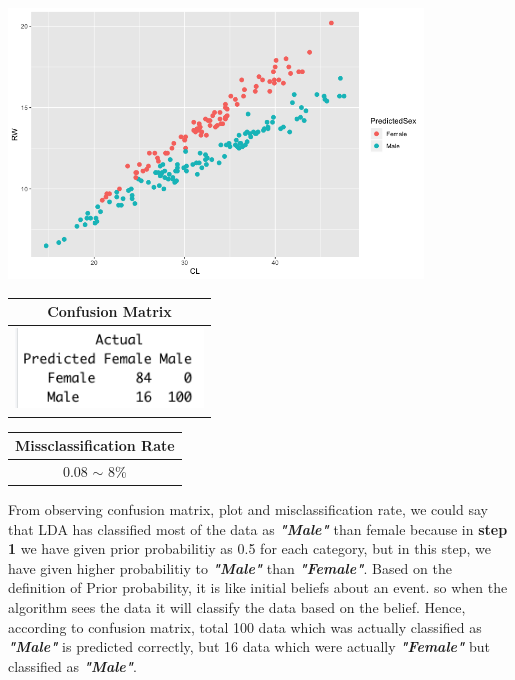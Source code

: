 \documentclass[a4paper,10pt]{article}
\begin{document}
\begin{center}
  \includegraphics[width=110mm,scale=0.10]{CL_RW_Lda_Plot_Priors.png} 
  \begin{tabular}{|c|}
    \hline
    \textbf{Confusion Matrix} \\
    \hline
    \includegraphics[width=50mm,scale=0.10]{CL_RW_LDA_Confusion_Matrix_Prior.png} \\
    \hline
  \end{tabular} \par
  \begin{tabular}{|c|}
    \hline
    \textbf{Missclassification Rate} \\
    \hline
    0.08 $\sim$ 8\% \\
    \hline
  \end{tabular}
\end{center} \par
From observing confusion matrix, plot and misclassification rate, we could say that LDA has classified most of the data as
\textbf{\textit{"Male"}} than female because in \textbf{step 1} we have given prior probabilitiy as 0.5 for each
category, but in this step, we have given higher probabilitiy to \textbf{\textit{"Male"}} than \textbf{\textit{"Female"}}. 
Based on the definition of Prior probability, it is like initial beliefs about an event. 
so when the algorithm sees the data it will classify the data based on the belief. Hence, according to confusion matrix,
total 100 data which was actually classified as \textbf{\textit{"Male"}} is predicted correctly, but 16 data which
were actually \textbf{\textit{"Female"}} but classified as \textbf{\textit{"Male"}}.\par
\end{document}
